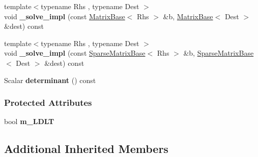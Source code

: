 \begin{DoxyCompactItemize}
\item 
\mbox{\label{group___sparse_cholesky___module_a268f4331cd8976ec6f106a34b97bba23}} 
{\footnotesize template$<$typename Rhs , typename Dest $>$ }\\void {\bfseries \+\_\+solve\+\_\+impl} (const \hyperlink{group___core___module_class_eigen_1_1_matrix_base}{Matrix\+Base}$<$ Rhs $>$ \&b, \hyperlink{group___core___module_class_eigen_1_1_matrix_base}{Matrix\+Base}$<$ Dest $>$ \&dest) const
\item 
\mbox{\label{group___sparse_cholesky___module_a7e151cd125308b335949babf791fe6e6}} 
{\footnotesize template$<$typename Rhs , typename Dest $>$ }\\void {\bfseries \+\_\+solve\+\_\+impl} (const \hyperlink{group___sparse_core___module_class_eigen_1_1_sparse_matrix_base}{Sparse\+Matrix\+Base}$<$ Rhs $>$ \&b, \hyperlink{group___sparse_core___module_class_eigen_1_1_sparse_matrix_base}{Sparse\+Matrix\+Base}$<$ Dest $>$ \&dest) const
\item 
\mbox{\label{group___sparse_cholesky___module_a2cffa2384b8290de34b5a294d4383e70}} 
Scalar {\bfseries determinant} () const
\end{DoxyCompactItemize}
\subsubsection*{Protected Attributes}
\begin{DoxyCompactItemize}
\item 
\mbox{\label{group___sparse_cholesky___module_a6439a5ccdf57c278fa2c01202d1e0b35}} 
bool {\bfseries m\+\_\+\+L\+D\+LT}
\end{DoxyCompactItemize}
\subsection*{Additional Inherited Members}


